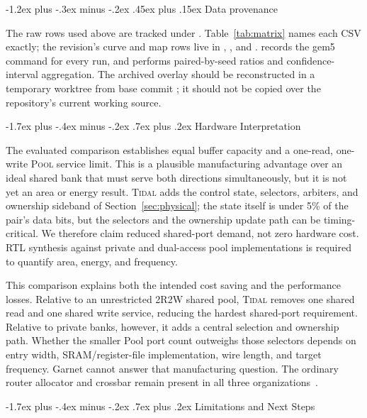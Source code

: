 \documentclass[10pt,twocolumn]{article}
\makeatletter
\newcommand{\system}{\textsc{Tidal}\xspace}
\newcommand{\pool}{\textsc{Pool}\xspace}
\renewcommand\section{\@startsection{section}{1}{\z@}%
  {-1.7ex plus -.4ex minus -.2ex}%
  {.7ex plus .2ex}%
  {\normalfont\large\bfseries}}
\renewcommand\subsection{\@startsection{subsection}{2}{\z@}%
  {-1.2ex plus -.3ex minus -.2ex}%
  {.45ex plus .15ex}%
  {\normalfont\normalsize\bfseries}}
\makeatother
\begin{document}
\subsection{Data provenance}

The raw rows used above are tracked under
. Table~\ref{tab:matrix} names each
CSV exactly; the revision's curve and map rows live in
, , and
.  records the gem5
command for every run, and  performs paired-by-seed
ratios and confidence-interval aggregation. The archived overlay should be reconstructed
in a temporary worktree from base commit ; it should not be
copied over the repository's current working source.

\section{Hardware Interpretation}

The evaluated comparison establishes equal buffer capacity and a one-read,
one-write \pool service limit. This is a plausible manufacturing advantage
over an ideal shared bank that must serve both directions simultaneously, but
it is not yet an area or energy result. \system adds the control state,
selectors, arbiters, and ownership sideband of Section~\ref{sec:physical};
the state itself is under 5\% of the pair's data bits, but the selectors and
the ownership update path can be timing-critical. We therefore claim reduced
shared-port demand, not zero hardware cost. RTL synthesis against private and dual-access pool
implementations is required to quantify area, energy, and frequency.

This comparison explains both the intended cost saving and the performance
losses. Relative to an unrestricted 2R2W shared pool, \system removes one
shared read and one shared write service, reducing the hardest shared-port
requirement. Relative to private banks, however, it adds a central selection
and ownership path. Whether the smaller Pool port count outweighs those
selectors depends on entry width, SRAM/register-file implementation, wire
length, and target frequency. Garnet cannot answer that manufacturing
question. The ordinary router allocator and crossbar remain present in all
three organizations~\cite{dallytowles2004}.

\section{Limitations and Next Steps}
\label{sec:limits}
\end{document}
